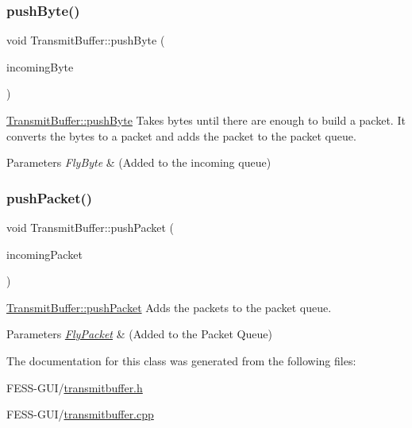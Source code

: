 \subsubsection{\texorpdfstring{push\+Byte()}{pushByte()}}
{\footnotesize\ttfamily void Transmit\+Buffer\+::push\+Byte (\begin{DoxyParamCaption}\item[{\hyperlink{conversions_8h_a1f006e31a957accfe6aa1bf6f401efce}{Fly\+Byte}}]{incoming\+Byte }\end{DoxyParamCaption})}



\hyperlink{class_transmit_buffer_aa7966064a6abaeb5ff3f7c8ff0402ec3}{Transmit\+Buffer\+::push\+Byte} Takes bytes until there are enough to build a packet. It converts the bytes to a packet and adds the packet to the packet queue. 


\begin{DoxyParams}{Parameters}
{\em Fly\+Byte} & (Added to the incoming queue) \\
\hline
\end{DoxyParams}
\hypertarget{class_transmit_buffer_a002757b58f4227167db20c8977bbdb28}{}\label{class_transmit_buffer_a002757b58f4227167db20c8977bbdb28} 
\subsubsection{\texorpdfstring{push\+Packet()}{pushPacket()}}
{\footnotesize\ttfamily void Transmit\+Buffer\+::push\+Packet (\begin{DoxyParamCaption}\item[{\hyperlink{class_fly_packet}{Fly\+Packet}}]{incoming\+Packet }\end{DoxyParamCaption})}



\hyperlink{class_transmit_buffer_a002757b58f4227167db20c8977bbdb28}{Transmit\+Buffer\+::push\+Packet} Adds the packets to the packet queue. 


\begin{DoxyParams}{Parameters}
{\em \hyperlink{class_fly_packet}{Fly\+Packet}} & (Added to the Packet Queue) \\
\hline
\end{DoxyParams}


The documentation for this class was generated from the following files\+:\begin{DoxyCompactItemize}
\item 
F\+E\+S\+S-\/\+G\+U\+I/\hyperlink{transmitbuffer_8h}{transmitbuffer.\+h}\item 
F\+E\+S\+S-\/\+G\+U\+I/\hyperlink{transmitbuffer_8cpp}{transmitbuffer.\+cpp}\end{DoxyCompactItemize}
